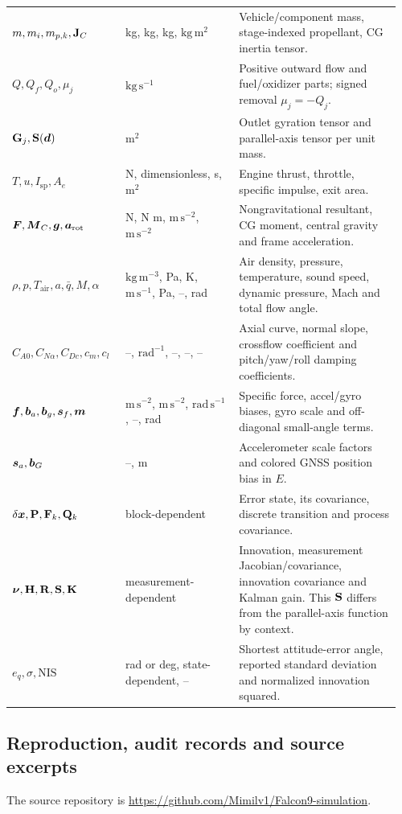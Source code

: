 \begin{longtable}{@{}>{\raggedright\arraybackslash}p{0.28\linewidth}>{\raggedright\arraybackslash}p{0.28\linewidth}>{\raggedright\arraybackslash}p{0.4\linewidth}@{}}
$m,m_i,m_{p,k},\mathbf{J}_C$ & kg, kg, kg, $\mathrm{kg\,m^2}$ & Vehicle/component mass, stage-indexed propellant, CG inertia tensor. \\
$Q,Q_f,Q_o,\mu_j$ & $\mathrm{kg\,s^{-1}}$ & Positive outward flow and fuel/oxidizer parts; signed removal $\mu_j=-Q_j$. \\
$\mathbf{G}_j,\mathbf{S}(\boldsymbol{d})$ & $\mathrm{m^2}$ & Outlet gyration tensor and parallel-axis tensor per unit mass. \\
$T,u,I_{\mathrm{sp}},A_e$ & N, dimensionless, s, $\mathrm{m^2}$ & Engine thrust, throttle, specific impulse, exit area. \\
$\boldsymbol{F},\boldsymbol{M}_C,\boldsymbol{g},\boldsymbol{a}_{\mathrm{rot}}$ & N, N m, $\mathrm{m\,s^{-2}}$, $\mathrm{m\,s^{-2}}$ & Nongravitational resultant, CG moment, central gravity and frame acceleration. \\
$\rho,p,T_{\mathrm{air}},a,\bar q,M,\alpha$ & $\mathrm{kg\,m^{-3}}$, Pa, K, $\mathrm{m\,s^{-1}}$, Pa, --, rad & Air density, pressure, temperature, sound speed, dynamic pressure, Mach and total flow angle. \\
$C_{A0},C_{N\alpha},C_{Dc},c_m,c_l$ & --, $\mathrm{rad^{-1}}$, --, --, -- & Axial curve, normal slope, crossflow coefficient and pitch/yaw/roll damping coefficients. \\
$\boldsymbol{f},\boldsymbol{b}_a,\boldsymbol{b}_g,\boldsymbol{s}_f,\boldsymbol{m}$ & $\mathrm{m\,s^{-2}}$, $\mathrm{m\,s^{-2}}$, $\mathrm{rad\,s^{-1}}$, --, rad & Specific force, accel/gyro biases, gyro scale and off-diagonal small-angle terms. \\
$\boldsymbol{s}_a,\boldsymbol{b}_G$ & --, m & Accelerometer scale factors and colored GNSS position bias in $E$. \\
$\delta\boldsymbol{x},\mathbf{P},\mathbf{F}_k,\mathbf{Q}_k$ & block-dependent & Error state, its covariance, discrete transition and process covariance. \\
$\boldsymbol{\nu},\mathbf{H},\mathbf{R},\mathbf{S},\mathbf{K}$ & measurement-dependent & Innovation, measurement Jacobian/covariance, innovation covariance and Kalman gain. This $\mathbf{S}$ differs from the parallel-axis function by context. \\
$e_q,\sigma,\mathrm{NIS}$ & rad or deg, state-dependent, -- & Shortest attitude-error angle, reported standard deviation and normalized innovation squared. \\
\end{longtable}\endgroup

\subsection{Reproduction, audit records and source excerpts}
\label{sec:appendix-reproduction}
The source repository is \url{https://github.com/Mimilv1/Falcon9-simulation}.

